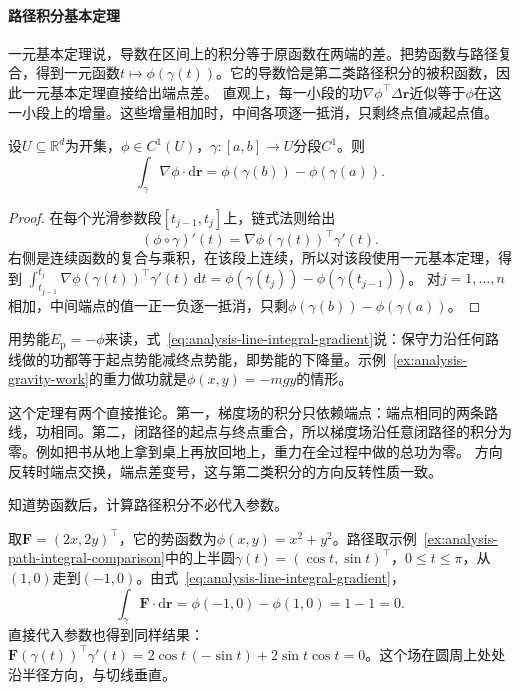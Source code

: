 \paragraph{路径积分基本定理}

一元基本定理说，导数在区间上的积分等于原函数在两端的差。把势函数与路径复合，得到一元函数$t\mapsto\phi(\gamma(t))$。它的导数恰是第二类路径积分的被积函数，因此一元基本定理直接给出端点差。
直观上，每一小段的功$\nabla\phi^\top\Delta\bm r$近似等于$\phi$在这一小段上的增量。这些增量相加时，中间各项逐一抵消，只剩终点值减起点值。
\begin{theorem}[路径积分基本定理]
设$U\subseteq\mathbb R^d$为开集，$\phi\in C^1(U)$，$\gamma:[a,b]\to U$分段$C^1$。则
\begin{equation}
  \int_{\gamma}\nabla\phi\mathbin{\cdot}\mathrm{d}\bm{r}
  =\phi(\gamma(b))-\phi(\gamma(a)).
\label{eq:analysis-line-integral-gradient}
\end{equation}
\end{theorem}
\begin{proof}
在每个光滑参数段$[t_{j-1},t_j]$上，链式法则给出
\[
 (\phi\circ\gamma)'(t)=\nabla\phi(\gamma(t))^\top\gamma'(t).
\]
右侧是连续函数的复合与乘积，在该段上连续，所以对该段使用一元基本定理，得到
$\int_{t_{j-1}}^{t_j}\nabla\phi(\gamma(t))^\top\gamma'(t)\,\mathrm dt=\phi(\gamma(t_j))-\phi(\gamma(t_{j-1}))$。
对$j=1,\dots,n$相加，中间端点的值一正一负逐一抵消，只剩$\phi(\gamma(b))-\phi(\gamma(a))$。
\end{proof}

用势能$E_{\mathrm p}=-\phi$来读，式~\eqref{eq:analysis-line-integral-gradient}说：保守力沿任何路线做的功都等于起点势能减终点势能，即势能的下降量。示例~\ref{ex:analysis-gravity-work}的重力做功就是$\phi(x,y)=-mgy$的情形。

这个定理有两个直接推论。第一，梯度场的积分只依赖端点：端点相同的两条路线，功相同。第二，闭路径的起点与终点重合，所以梯度场沿任意闭路径的积分为零。例如把书从地上拿到桌上再放回地上，重力在全过程中做的总功为零。
方向反转时端点交换，端点差变号，这与第二类积分的方向反转性质一致。

知道势函数后，计算路径积分不必代入参数。
\begin{example}[用势函数计算沿半圆的积分]
取$\bm F=(2x,2y)^\top$，它的势函数为$\phi(x,y)=x^2+y^2$。路径取示例~\ref{ex:analysis-path-integral-comparison}中的上半圆$\gamma(t)=(\cos t,\sin t)^\top$，$0\leq t\leq\pi$，从$(1,0)$走到$(-1,0)$。由式~\eqref{eq:analysis-line-integral-gradient}，
\[
 \int_\gamma\bm F\cdot\mathrm d\bm r=\phi(-1,0)-\phi(1,0)=1-1=0.
\]
直接代入参数也得到同样结果：$\bm F(\gamma(t))^\top\gamma'(t)=2\cos t\,(-\sin t)+2\sin t\cos t=0$。这个场在圆周上处处沿半径方向，与切线垂直。
\end{example}

